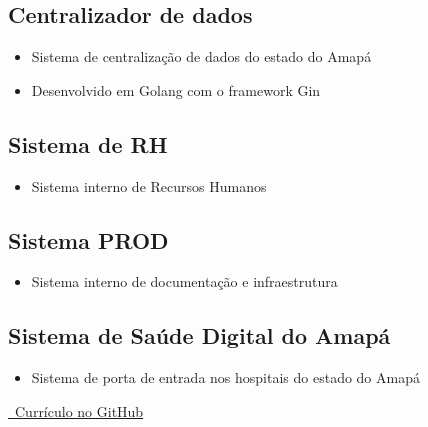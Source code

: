 \documentclass{article}
\begin{document}
\subsection{Centralizador de dados}
\begin{itemize}
  \item Sistema de centralização de dados do estado do Amapá
  \item Desenvolvido em Golang com o framework Gin
\end{itemize}

\subsection{Sistema de RH}
\begin{itemize}
  \item Sistema interno de Recursos Humanos
\end{itemize}

\subsection{Sistema PROD}
\begin{itemize}
  \item Sistema interno de documentação e infraestrutura
\end{itemize}

\subsection{Sistema de Saúde Digital do Amapá}
\begin{itemize}
  \item Sistema de porta de entrada nos hospitais do estado do Amapá
\end{itemize}



\href{https://github.com/PedroPaulo-98/Curriculo}{\faGithub\ Currículo no GitHub}
\end{document}
